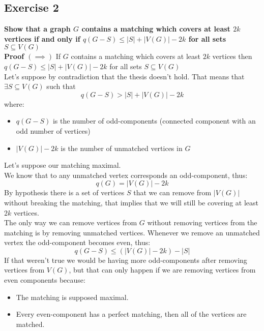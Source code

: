 \subsection*{Exercise 2}
\boldmath\textbf{Show that a graph $G$ contains a matching which covers at least $2k$ vertices if and only if $q(G - S) \leq |S| + |V(G)| - 2k$ for all sets $S \subseteq V(G)$\\
\linebreak
Proof $(\implies)$} \unboldmath If $G$ contains a matching which covers at least $2k$ vertices then $q(G - S) \leq |S| + |V(G)| - 2k$ for all sets $S \subseteq V(G)$\\ 
\linebreak
Let's suppose by contradiction that the thesis doesn't hold. That means that $\exists S \subseteq V(G)$ such that
\begin{equation*}
    q(G - S) > |S| + |V(G)| - 2k
\end{equation*}
where:
\begin{itemize}
    \item $q(G - S)$ is the number of odd-components (connected component with an odd number of vertices)
    \item $|V(G)| - 2k$ is the number of unmatched vertices in $G$
\end{itemize}
Let's suppose our matching maximal.\\
\linebreak
We know that to any unmatched vertex corresponds an odd-component, thus:
\begin{equation*}
    q(G) = |V(G)| - 2k
\end{equation*}
By hypothesis there is a set of vertices $S$ that we can remove from $|V(G)|$ without breaking the matching, that implies that we will still be covering at least $2k$ vertices.\\
The only way we can remove vertices from $G$ without removing vertices from the matching is by removing unmatched vertices. Whenever we remove an unmatched vertex the odd-component becomes even, thus:
\begin{equation*}
    q(G - S) \leq (|V(G)| - 2k) - |S|
\end{equation*}
If that weren't true we would be having more odd-components after removing vertices from $V(G)$, but that can only happen if we are removing vertices from even components because:
\begin{itemize}
    \item The matching is supposed maximal.
    \item Every even-component has a perfect matching, then all of the vertices are matched.
\end{itemize}
